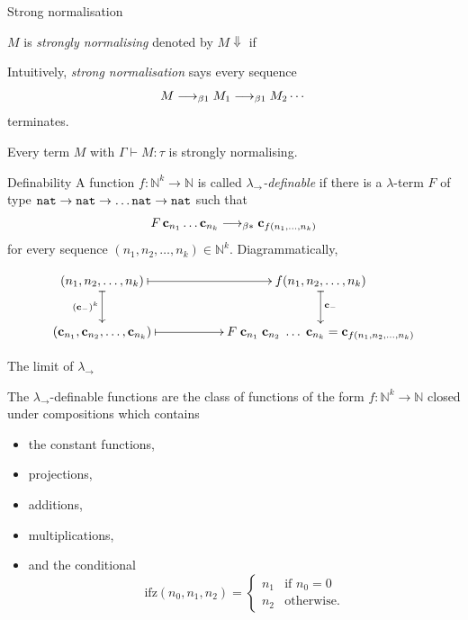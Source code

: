 \begin{frame}{Strong normalisation}
  \begin{definition}
    $M$ is \emph{strongly normalising} denoted by $M \Downarrow$ if 
    \begin{prooftree}
    \end{prooftree}
    
  \end{definition}
  Intuitively, \emph{strong normalisation} says every sequence
    \[
      M \onereduce M_1 \onereduce M_2 \cdots
    \]
  terminates.
  \begin{theorem}
    Every term $M$ with $\Gamma \vdash M : \tau$ is strongly normalising.
  \end{theorem}
  
\end{frame}

\begin{frame}{Definability}
  A function $f\colon \mathbb{N}^k \to \mathbb{N}$ is called
  \alert{\emph{$\lambda_\to$-definable}} if there is a $\lambda$-term $F$ of
  type $\nat \to \nat \to \dots \nat \to \nat$ such that
  \[
    F\,\bc_{n_1}\ldots\bc_{n_k} \reduce \bc_{f(n_1, \dots, n_k)}
  \]
  for every sequence $(n_1, n_2, \ldots, n_k) \in \mathbb{N}^k$.
  Diagrammatically, 

\[
  \xymatrix{
    (n_1, n_2, \ldots, n_k) \ar@{|->}[rr] \ar@{|->}[d]_{(\bc_{-})^k} & & f(n_1,
    n_2, \ldots, n_k) \ar@{|->}[d]^{\bc_{-}}\\
    (\bc_{n_1}, \bc_{n_2}, \ldots, \bc_{n_k}) \ar@{|->}[rr] & & 
    F\;\bc_{n_1}\; \bc_{n_2}\; \ldots\;\bc_{n_k}
    = \bc_{f(n_1, n_2, \ldots, n_k)}
  }
\]
\end{frame}
\begin{frame}{The limit of $\lambda_\to$}
\begin{theorem}
  The $\lambda_\to$-definable functions are the class of functions
  of the form $f\colon \mathbb{N}^k \to \mathbb{N}$ closed under 
  compositions
  which contains
  \begin{itemize}
    \item the constant functions,
    \item projections,
    \item additions,
    \item multiplications,
    \item and the conditional 
  \[
    \mathrm{ifz}(n_0, n_1, n_2) = 
    \begin{cases}
      n_1 & \text{if } n_0 = 0\\
      n_2 & \text{otherwise.}
    \end{cases}
  \]
  \end{itemize}
\end{theorem}
\end{frame}

